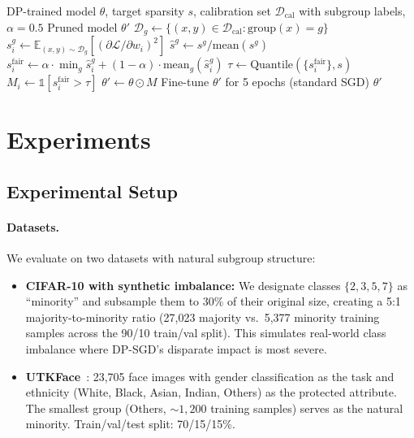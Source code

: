 \documentclass{article}
\newcommand{\FairPrunDP}{\textsc{FairPrune-DP}}
\begin{document}
\begin{algorithm}[t]
\caption{\FairPrunDP{}: Worst-Group-Aware Pruning for DP Models}
\label{alg:fairprune}
\begin{algorithmic}[1]
\REQUIRE DP-trained model $\theta$, target sparsity $s$, calibration set $\mathcal{D}_{\text{cal}}$ with subgroup labels, $\alpha = 0.5$
\ENSURE Pruned model $\theta'$
    \STATE $\mathcal{D}_g \leftarrow \{(x,y) \in \mathcal{D}_{\text{cal}} : \text{group}(x) = g\}$
        \STATE $s_i^g \leftarrow \mathbb{E}_{(x,y) \sim \mathcal{D}_g}\left[(\partial \mathcal{L} / \partial w_i)^2\right]$ \hfill {}
    \ENDFOR
    \STATE $\hat{s}^g \leftarrow s^g / \text{mean}(s^g)$ \hfill {}
\ENDFOR
{}
    \STATE $s_i^{\text{fair}} \leftarrow \alpha \cdot \min_g \hat{s}_i^g + (1-\alpha) \cdot \text{mean}_g(\hat{s}_i^g)$
\ENDFOR
\STATE $\tau \leftarrow \text{Quantile}(\{s_i^{\text{fair}}\}, s)$ \hfill {}
\STATE $M_i \leftarrow \mathbb{1}[s_i^{\text{fair}} > \tau]$ \hfill {}
\STATE $\theta' \leftarrow \theta \odot M$ \hfill {}
\STATE Fine-tune $\theta'$ for 5 epochs (standard SGD)
\RETURN $\theta'$
\end{algorithmic}
\end{algorithm}


\section{Experiments}
\label{sec:experiments}

\subsection{Experimental Setup}
\label{sec:setup}

\paragraph{Datasets.}
We evaluate on two datasets with natural subgroup structure:
\begin{itemize}
    \item \textbf{CIFAR-10 with synthetic imbalance:} We designate classes $\{2, 3, 5, 7\}$ as ``minority'' and subsample them to 30\% of their original size, creating a 5:1 majority-to-minority ratio (27,023 majority vs.\ 5,377 minority training samples across the 90/10 train/val split). This simulates real-world class imbalance where DP-SGD's disparate impact is most severe.
    \item \textbf{UTKFace}~\citep{zhang2017age}: 23,705 face images with gender classification as the task and ethnicity (White, Black, Asian, Indian, Others) as the protected attribute. The smallest group (Others, ${\sim}1,200$ training samples) serves as the natural minority. Train/val/test split: 70/15/15\%.
\end{itemize}
\end{document}
